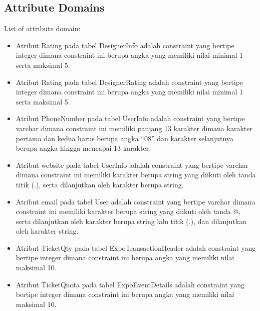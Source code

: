 \subsection{Attribute Domains}
List of attribute domain:
\begin{itemize}
	\item Atribut Rating pada tabel DesignerInfo adalah constraint yang bertipe integer dimana constraint ini berupa angka yang memiliki nilai minimal 1 serta maksimal 5.
	\item Atribut Rating pada tabel DesignerRating adalah constraint yang bertipe integer dimana constraint ini berupa angka yang memiliki nilai minimal 1 serta maksimal 5.
	\item Atribut PhoneNumber pada tabel UserInfo adalah constraint yang bertipe varchar dimana constraint ini memiliki panjang 13 karakter dimana karakter pertama dan kedua harus berupa angka “08” dan karakter selanjutnya berupa angka hingga mencapai 13 karakter.
	\item Atribut website pada tabel UserInfo adalah constraint yang bertipe varchar dimana constraint ini memiliki karakter berupa string yang diikuti oleh tanda titik (.), serta dilanjutkan oleh  karakter berupa string.
	\item Atribut email pada tabel User adalah constraint yang bertipe varchar dimana constraint ini memiliki karakter berupa string yang diikuti oleh tanda @, serta dilanjutkan oleh karakter berupa string lalu titik (.), dan dilanjutkan oleh karakter string.
	\item Atribut TicketQty pada tabel ExpoTransactionHeader adalah constraint yang bertipe integer dimana constraint ini berupa angka yang memiliki nilai maksimal 10.
	\item Atribut TicketQuota pada tabel ExpoEventDetails adalah constraint yang bertipe integer dimana constraint ini berupa angka yang memiliki nilai maksimal 10.
\end{itemize}

